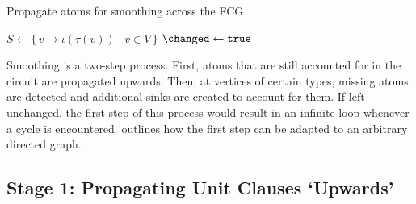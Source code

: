 \documentclass{article}
\theoremstyle{definition}
\begin{document}
\begin{algorithm}
  \caption{Propagate atoms for smoothing across the FCG}\label{alg:smoothing}
  $S \gets \{\, v \mapsto \iota(\tau(v)) \mid v \in V \,\}$\;
  $\changed \gets \texttt{true}$\;
\end{algorithm}

Smoothing is a two-step process. First, atoms that are still accounted for in
the circuit are propagated upwards. Then, at vertices of certain types, missing
atoms are detected and additional sinks are created to account for them. If left
unchanged, the first step of this process would result in an infinite loop
whenever a cycle is encountered.  outlines how the first
step can be adapted to an arbitrary directed graph.

\subsection{Stage 1: Propagating Unit Clauses `Upwards'}
\end{document}
